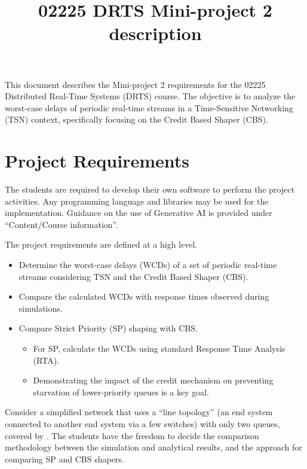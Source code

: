 \documentclass[a4paper,11pt]{article}
\begin{document}
\title{\vspace{-50pt}02225 DRTS Mini-project 2 description}
\author{}
\date{}

\maketitle

\vspace{-20pt}
This document describes the Mini-project 2 requirements for the 02225 Distributed Real-Time Systems (DRTS) course. The objective is to analyze the worst-case delays of periodic real-time streams in a Time-Sensitive Networking (TSN) context, specifically focusing on the Credit Based Shaper (CBS).

\section{Project Requirements}

The students are required to develop their own software to perform the project activities. Any programming language and libraries may be used for the implementation. Guidance on the use of Generative AI is provided under ``Content/Course information''.

The project requirements are defined at a high level. 

\begin{itemize}
    \item Determine the worst-case delays (WCDs) of a set of periodic real-time streams considering TSN and the Credit Based Shaper (CBS).
    \item Compare the calculated WCDs with response times observed during simulations.
    \item Compare Strict Priority (SP) shaping with CBS.
    \begin{itemize}
        \item For SP, calculate the WCDs using standard Response Time Analysis (RTA).
        \item Demonstrating the impact of the credit mechanism on preventing starvation of lower-priority queues is a key goal.
    \end{itemize}
\end{itemize}

Consider a simplified network that uses a ``line topology'' (an end system connected to another end system via a few switches) with only two queues, covered by \cite{Cao2016-TightWorstcaseResponsetimea}. The students have the freedom to decide the comparison methodology between the simulation and analytical results, and the approach for comparing SP and CBS shapers. 
\end{document}
